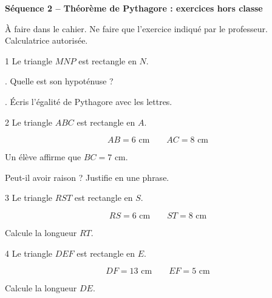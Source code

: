 \documentclass[9.5pt,a4paper,landscape]{article}
\begin{document}
\fontsize{9}{10.5}\selectfont

\begin{center}
{\large\bfseries\color{bleu}
Séquence 2 -- Théorème de Pythagore : exercices hors classe}\par

\vspace{0.1em}

{\small
À faire dans le cahier.
Ne faire que l'exercice indiqué par le professeur.
Calculatrice autorisée.}
\end{center}

\vspace{0.25em}


\noindent
\begin{minipage}[t]{0.242\linewidth}
\begin{exo}{1}
Le triangle \(MNP\) est rectangle en \(N\).

. Quelle est son hypoténuse ?

. Écris l'égalité de Pythagore avec les lettres.
\end{exo}
\end{minipage}
\hfill
%
\begin{minipage}[t]{0.242\linewidth}
\begin{exo}{2}
Le triangle \(ABC\) est rectangle en \(A\).

\[
AB=6\text{ cm}
\qquad
AC=8\text{ cm}
\]

Un élève affirme que \(BC=7\) cm.

Peut-il avoir raison ? Justifie en une phrase.
\end{exo}
\end{minipage}
\hfill
%
\begin{minipage}[t]{0.242\linewidth}
\begin{exo}{3}
Le triangle \(RST\) est rectangle en \(S\).

\[
RS=6\text{ cm}
\qquad
ST=8\text{ cm}
\]

Calcule la longueur \(RT\).
\end{exo}
\end{minipage}
\hfill
%
\begin{minipage}[t]{0.242\linewidth}
\begin{exo}{4}
Le triangle \(DEF\) est rectangle en \(E\).

\[
DF=13\text{ cm}
\qquad
EF=5\text{ cm}
\]

Calcule la longueur \(DE\).
\end{exo}
\end{minipage}
\end{document}
